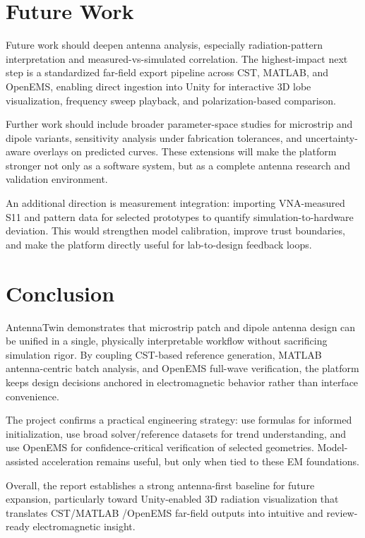 \documentclass[12pt,a4paper]{article}
\begin{document}
\section{Future Work}
Future work should deepen antenna analysis, especially radiation-pattern interpretation and measured-vs-simulated correlation. The highest-impact next step is a standardized far-field export pipeline across CST, MATLAB, and OpenEMS, enabling direct ingestion into Unity for interactive 3D lobe visualization, frequency sweep playback, and polarization-based comparison.

Further work should include broader parameter-space studies for microstrip and dipole variants, sensitivity analysis under fabrication tolerances, and uncertainty-aware overlays on predicted curves. These extensions will make the platform stronger not only as a software system, but as a complete antenna research and validation environment.

An additional direction is measurement integration: importing VNA-measured S11 and pattern data for selected prototypes to quantify simulation-to-hardware deviation. This would strengthen model calibration, improve trust boundaries, and make the platform directly useful for lab-to-design feedback loops.

\section{Conclusion}
AntennaTwin demonstrates that microstrip patch and dipole antenna design can be unified in a single, physically interpretable workflow without sacrificing simulation rigor. By coupling CST-based reference generation, MATLAB antenna-centric batch analysis, and OpenEMS full-wave verification, the platform keeps design decisions anchored in electromagnetic behavior rather than interface convenience.

The project confirms a practical engineering strategy: use formulas for informed initialization, use broad solver/reference datasets for trend understanding, and use OpenEMS for confidence-critical verification of selected geometries. Model-assisted acceleration remains useful, but only when tied to these EM foundations.

Overall, the report establishes a strong antenna-first baseline for future expansion, particularly toward Unity-enabled 3D radiation visualization that translates CST/MATLAB /OpenEMS far-field outputs into intuitive and review-ready electromagnetic insight.
\end{document}
